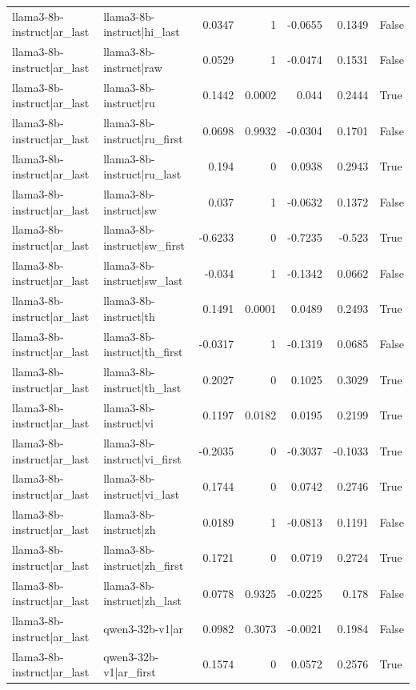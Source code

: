 \begin{table}
\begin{tabular}{l l r r r r l}
llama3-8b-instruct|ar_last & llama3-8b-instruct|hi_last & 0.0347 & 1 & -0.0655 & 0.1349 & False \\
llama3-8b-instruct|ar_last & llama3-8b-instruct|raw & 0.0529 & 1 & -0.0474 & 0.1531 & False \\
llama3-8b-instruct|ar_last & llama3-8b-instruct|ru & 0.1442 & 0.0002 & 0.044 & 0.2444 & True \\
llama3-8b-instruct|ar_last & llama3-8b-instruct|ru_first & 0.0698 & 0.9932 & -0.0304 & 0.1701 & False \\
llama3-8b-instruct|ar_last & llama3-8b-instruct|ru_last & 0.194 & 0 & 0.0938 & 0.2943 & True \\
llama3-8b-instruct|ar_last & llama3-8b-instruct|sw & 0.037 & 1 & -0.0632 & 0.1372 & False \\
llama3-8b-instruct|ar_last & llama3-8b-instruct|sw_first & -0.6233 & 0 & -0.7235 & -0.523 & True \\
llama3-8b-instruct|ar_last & llama3-8b-instruct|sw_last & -0.034 & 1 & -0.1342 & 0.0662 & False \\
llama3-8b-instruct|ar_last & llama3-8b-instruct|th & 0.1491 & 0.0001 & 0.0489 & 0.2493 & True \\
llama3-8b-instruct|ar_last & llama3-8b-instruct|th_first & -0.0317 & 1 & -0.1319 & 0.0685 & False \\
llama3-8b-instruct|ar_last & llama3-8b-instruct|th_last & 0.2027 & 0 & 0.1025 & 0.3029 & True \\
llama3-8b-instruct|ar_last & llama3-8b-instruct|vi & 0.1197 & 0.0182 & 0.0195 & 0.2199 & True \\
llama3-8b-instruct|ar_last & llama3-8b-instruct|vi_first & -0.2035 & 0 & -0.3037 & -0.1033 & True \\
llama3-8b-instruct|ar_last & llama3-8b-instruct|vi_last & 0.1744 & 0 & 0.0742 & 0.2746 & True \\
llama3-8b-instruct|ar_last & llama3-8b-instruct|zh & 0.0189 & 1 & -0.0813 & 0.1191 & False \\
llama3-8b-instruct|ar_last & llama3-8b-instruct|zh_first & 0.1721 & 0 & 0.0719 & 0.2724 & True \\
llama3-8b-instruct|ar_last & llama3-8b-instruct|zh_last & 0.0778 & 0.9325 & -0.0225 & 0.178 & False \\
llama3-8b-instruct|ar_last & qwen3-32b-v1|ar & 0.0982 & 0.3073 & -0.0021 & 0.1984 & False \\
llama3-8b-instruct|ar_last & qwen3-32b-v1|ar_first & 0.1574 & 0 & 0.0572 & 0.2576 & True \\

\end{tabular}
\end{table}
